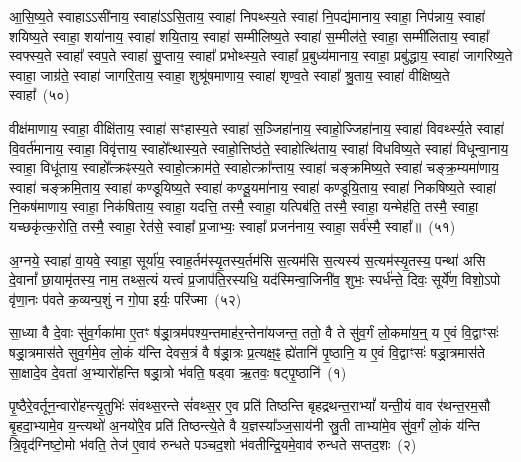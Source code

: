 आ॒सि॒ष्य॒ते स्वाहा\-ऽऽ\-सी॑नाय॒ स्वाहा॑\-ऽऽ\-सि॒ताय॒ स्वाहा॑ निपथ्स्य॒ते स्वाहा॑ नि॒पद्य॑मानाय॒ स्वाहा॒ निप॑न्नाय॒ स्वाहा॑ शयिष्य॒ते स्वाहा॒ शया॑नाय॒ स्वाहा॑ शयि॒ताय॒ स्वाहा॑ सम्मीलिष्य॒ते स्वाहा॑ स॒म्मील॑ते॒ स्वाहा॒ सम्मी॑लिताय॒ स्वाहा᳚ स्वफ्स्य॒ते स्वाहा᳚ स्वप॒ते स्वाहा॑ सु॒प्ताय॒ स्वाहा᳚ प्रभोथ्स्य॒ते स्वाहा᳚ प्र॒बुध्य॑मानाय॒ स्वाहा॒ प्रबु॑द्धाय॒ स्वाहा॑ जागरिष्य॒ते स्वाहा॒ जाग्र॑ते॒ स्वाहा॑ जागरि॒ताय॒ स्वाहा॒ शुश्रू॑षमाणाय॒ स्वाहा॑ शृण्व॒ते स्वाहा᳚ श्रु॒ताय॒ स्वाहा॑ वीक्षिष्य॒ते स्वाहा᳚~(५०)

वीक्ष॑माणाय॒ स्वाहा॒ वीक्षि॑ताय॒ स्वाहा॑ सꣳहास्य॒ते स्वाहा॑ स॒ञ्जिहा॑नाय॒ स्वाहो॒ज्जिहा॑नाय॒ स्वाहा॑ विवर्थ्स्य॒ते स्वाहा॑ वि॒वर्त॑मानाय॒ स्वाहा॒ विवृ॑त्ताय॒ स्वाहो᳚त्थास्य॒ते स्वाहो॒त्तिष्ठ॑ते॒ स्वाहोत्थि॑ताय॒ स्वाहा॑ विधविष्य॒ते स्वाहा॑ विधून्वा॒नाय॒ स्वाहा॒ विधू॑ताय॒ स्वाहो᳚त्क्रꣴस्य॒ते स्वाहो॒त्क्राम॑ते॒ स्वाहोत्क्रा᳚न्ताय॒ स्वाहा॑ चङ्क्रमिष्य॒ते स्वाहा॑ चङ्क्र॒म्यमा॑णाय॒ स्वाहा॑ चङ्क्रमि॒ताय॒ स्वाहा॑ कण्डूयिष्य॒ते स्वाहा॑ कण्डू॒यमा॑नाय॒ स्वाहा॑ कण्डूयि॒ताय॒ स्वाहा॑ निकषिष्य॒ते स्वाहा॑ नि॒कष॑माणाय॒ स्वाहा॒ निक॑षिताय॒ स्वाहा॒ यदत्ति॒ तस्मै॒ स्वाहा॒ यत्पिब॑ति॒ तस्मै॒ स्वाहा॒ यन्मेह॑ति॒ तस्मै॒ स्वाहा॒ यच्छकृ॑त्क॒रोति॒ तस्मै॒ स्वाहा॒ रेत॑से॒ स्वाहा᳚ प्र॒जाभ्यः॒ स्वाहा᳚ प्रजन॑नाय॒ स्वाहा॒ सर्व॑स्मै॒ स्वाहा᳚॥~(५१)

{\anuvakamend[{}]}

अ॒ग्नये॒ स्वाहा॑ वा॒यवे॒ स्वाहा॒ सूर्या॑य॒ स्वाह॒र्तम॑स्यृ॒तस्य॒र्तम॑सि स॒त्यम॑सि स॒त्यस्य॑ स॒त्यम॑स्यृ॒तस्य॒ पन्था॑ असि दे॒वानां᳚ छा॒यामृ॑तस्य॒ नाम॒ तथ्स॒त्यं यत्त्वं प्र॒जा\-प॑ति॒रस्यधि॒ यद॑स्मिन्वा॒जिनी॑व॒ शुभः॒ स्पर्ध॑न्ते॒ दिवः॒ सूर्ये॑ण॒ विशो॒\-ऽपो वृ॑णा॒नः प॑वते क॒व्यन्प॒शुं न गो॒पा इर्यः॒ परि॑ज्मा~(५२)


{\anuvakamend[{}]}


\setcounter{anuvakam}{0}
सा॒ध्या वै दे॒वाः सु॑व॒र्गका॑मा ए॒तꣳ ष॑ड्रा॒त्रम॑पश्य॒न्तमाह॑र॒न्तेना॑यजन्त॒ ततो॒ वै ते सु॑व॒र्गं लो॒कमा॑य॒न्॒ य ए॒वं वि॒द्वाꣳसः॑ षड्रा॒त्रमास॑ते सुव॒र्गमे॒व लो॒कं य॑न्ति देवस॒त्रं वै ष॑ड्रा॒त्रः प्र॒त्यक्ष॒ꣴ॒ ह्ये॑तानि॑ पृ॒ष्ठानि॒ य ए॒वं वि॒द्वाꣳसः॑ षड्रा॒त्रमास॑ते सा॒क्षादे॒व दे॒वता॑ अ॒भ्यारो॑हन्ति षड्रा॒त्रो भ॑वति॒ षड्वा ऋ॒तवः॒ षट्पृ॒ष्ठानि॑~(१)

पृ॒ष्ठैरे॒वर्तून॒न्वारो॑हन्त्यृ॒तुभिः॑ संवथ्स॒रन्ते सं॑वथ्स॒र ए॒व प्रति॑ तिष्ठन्ति बृहद्रथन्त॒रा\-भ्यां᳚ यन्ती॒यं वाव र॑थन्त॒रम॒सौ बृ॒हदा॒भ्यामे॒व य॒न्त्यथो॑ अ॒नयो॑रे॒व प्रति॑ तिष्ठन्त्ये॒ते वै य॒ज्ञस्या᳚ञ्ज॒साय॑नी स्रु॒ती ताभ्या॑मे॒व सु॑व॒र्गं लो॒कं य॑न्ति त्रि॒वृद॑ग्निष्टो॒मो भ॑वति॒ तेज॑ ए॒वाव॑ रुन्धते पञ्चद॒शो भ॑वतीन्द्रि॒यमे॒वाव॑ रुन्धते सप्तद॒शः~(२)

